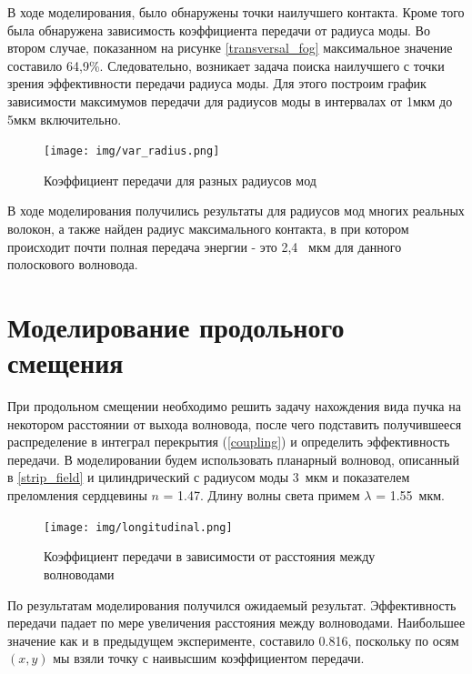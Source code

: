 В ходе моделирования, было обнаружены точки наилучшего контакта. Кроме того была обнаружена зависимость коэффициента передачи от радиуса моды. Во втором случае, показанном на рисунке \ref{transversal_fog} максимальное значение составило 64,9\%. Следовательно, возникает задача поиска наилучшего с точки зрения эффективности передачи радиуса моды. Для этого построим график зависимости максимумов передачи для радиусов моды в интервалах от 1мкм до 5мкм включительно.
\begin{figure}[h!]
		\texttt{[image: img/var\_radius.png]}
		\caption{Коэффициент передачи для разных радиусов мод}
\end{figure}

В ходе моделирования получились результаты для радиусов мод многих реальных волокон, а также найден радиус максимального контакта, в при котором происходит почти полная передача энергии - это 2,4~ мкм для данного полоскового волновода.

\section{Моделирование продольного смещения}

При продольном смещении необходимо решить задачу нахождения вида пучка на некотором расстоянии от выхода волновода, после чего подставить получившееся распределение в интеграл перекрытия (\ref{coupling}) и определить эффективность передачи.
В моделировании будем использовать планарный волновод, описанный в \ref{strip_field} и цилиндрический с радиусом моды 3~мкм и показателем преломления сердцевины $n$ = 1.47. Длину волны света примем $\lambda$ = 1.55~мкм.

\begin{figure}[h!]
	\texttt{[image: img/longitudinal.png]}
	\caption{Коэффициент передачи в зависимости от расстояния между волноводами}
	\label{longitudinal}
\end{figure}

По результатам моделирования получился ожидаемый результат. Эффективность передачи падает по мере увеличения расстояния между волноводами. Наибольшее значение как и в предыдущем эксперименте, составило 0.816, поскольку по осям $(x,y)$ мы взяли точку с наивысшим коэффициентом передачи.   